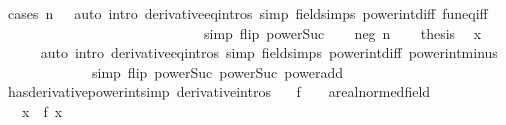 \begin{isabellebody}
\ {\isacharparenleft}{\kern0pt}cases\ {\isachardoublequoteopen}n\ {\isacharequal}{\kern0pt}\ {}{\isachardoublequoteclose}{\isacharparenright}{\kern0pt}\ {\isacharparenleft}{\kern0pt}auto\ intro{\isacharbang}{\kern0pt}{\isacharcolon}{\kern0pt}\ derivative{\isacharunderscore}{\kern0pt}eq{\isacharunderscore}{\kern0pt}intros\ simp{\isacharcolon}{\kern0pt}\ field{\isacharunderscore}{\kern0pt}simps\ power{\isacharunderscore}{\kern0pt}int{\isacharunderscore}{\kern0pt}diff\ fun{\isacharunderscore}{\kern0pt}eq{\isacharunderscore}{\kern0pt}iff\isanewline
\ \ \ \ \ \ \ \ \ \ \ \ \ \ \ \ \ \ \ \ \ \ \ \ \ \ \ \ \ simp\ flip{\isacharcolon}{\kern0pt}\ power{\isacharunderscore}{\kern0pt}Suc{\isacharparenright}{\kern0pt}\isanewline
{}\isamarkupfalse%
\isanewline
\ \ \isamarkupfalse%
\ {\isacharparenleft}{\kern0pt}neg\ n{\isacharparenright}{\kern0pt}\isanewline
\ \ \isamarkupfalse%
\ {\isacharquery}{\kern0pt}thesis\ \isamarkupfalse%
\ x\isanewline
\ \ \ \ \isamarkupfalse%
\ {\isacharparenleft}{\kern0pt}auto\ intro{\isacharbang}{\kern0pt}{\isacharcolon}{\kern0pt}\ derivative{\isacharunderscore}{\kern0pt}eq{\isacharunderscore}{\kern0pt}intros\ simp{\isacharcolon}{\kern0pt}\ field{\isacharunderscore}{\kern0pt}simps\ power{\isacharunderscore}{\kern0pt}int{\isacharunderscore}{\kern0pt}diff\ power{\isacharunderscore}{\kern0pt}int{\isacharunderscore}{\kern0pt}minus\isanewline
\ \ \ \ \ \ \ \ \ \ \ \ \ simp\ flip{\isacharcolon}{\kern0pt}\ power{\isacharunderscore}{\kern0pt}Suc\ power{\isacharunderscore}{\kern0pt}Suc{}\ power{\isacharunderscore}{\kern0pt}add{\isacharparenright}{\kern0pt}\isanewline
{}\isamarkupfalse%
%
\endisatagproof
{\isafoldproof}%
%
\isadelimproof
\isanewline
%
\endisadelimproof
\isanewline
{}\isamarkupfalse%
\ has{\isacharunderscore}{\kern0pt}derivative{\isacharunderscore}{\kern0pt}power{\isacharunderscore}{\kern0pt}int{\isacharbrackleft}{\kern0pt}simp{\isacharcomma}{\kern0pt}\ derivative{\isacharunderscore}{\kern0pt}intros{\isacharbrackright}{\kern0pt}{\isacharcolon}{\kern0pt}\isanewline
\ \ \ f\ {\isacharcolon}{\kern0pt}{\isacharcolon}{\kern0pt}\ {\isachardoublequoteopen}{\isacharunderscore}{\kern0pt}\ {\isasymRightarrow}\ {\isacharprime}{\kern0pt}a{\isacharcolon}{\kern0pt}{\isacharcolon}{\kern0pt}real{\isacharunderscore}{\kern0pt}normed{\isacharunderscore}{\kern0pt}field{\isachardoublequoteclose}\isanewline
\ \ \ x{\isacharcolon}{\kern0pt}\ \ {\isachardoublequoteopen}f\ x\ {\isasymnoteq}\ {}{\isachardoublequoteclose}\isanewline

\end{isabellebody}
